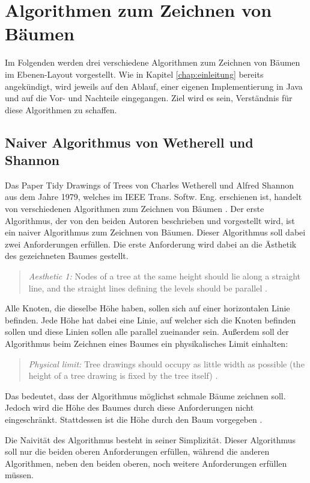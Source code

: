 \chapter{Algorithmen zum Zeichnen von Bäumen}
\label{chap:kapitel3}
Im Folgenden werden drei verschiedene Algorithmen zum Zeichnen von Bäumen im Ebenen-Layout vorgestellt. Wie in Kapitel \ref{chap:einleitung}
bereits angekündigt, wird jeweils auf den Ablauf, einer eigenen Implementierung in Java und auf die Vor- und Nachteile eingegangen. Ziel wird
es sein, Verständnis für diese Algorithmen zu schaffen.

\section{Naiver Algorithmus von Wetherell und Shannon}

Das Paper \glqq Tidy Drawings of Trees\grqq{} von Charles Wetherell und Alfred Shannon aus dem Jahre 1979, 
welches im IEEE Trans. Softw. Eng. erschienen ist, handelt von verschiedenen Algorithmen zum Zeichnen von Bäumen \cite[]{q1}.
Der erste Algorithmus, der von den beiden Autoren beschrieben und vorgestellt wird, ist ein naiver Algorithmus 
zum Zeichnen von Bäumen. Dieser Algorithmus soll dabei zwei Anforderungen erfüllen. Die erste Anforderung wird dabei
an die Ästhetik des gezeichneten Baumes gestellt. 
\begin{quotation}
	\textit{Aesthetic 1:} Nodes of a tree at the same height should lie
	along a straight line, and the straight lines defining the levels
	should be parallel \cite[S. 515]{q1}.
\end{quotation}
Alle Knoten, die dieselbe Höhe haben, sollen sich auf einer horizontalen
Linie befinden. Jede Höhe hat dabei eine Linie, auf welcher sich die Knoten befinden sollen und diese Linien sollen alle
parallel zueinander sein. Außerdem soll der Algorithmus beim Zeichnen eines Baumes ein physikalisches Limit einhalten:
\begin{quotation}
	\textit{Physical limit:} Tree drawings should occupy as little width
	as possible (the height of a tree drawing is fixed by the tree
	itself) \cite[S. 515]{q1}.
\end{quotation}
Das bedeutet, dass der Algorithmus möglichst schmale Bäume zeichnen soll. Jedoch wird die Höhe des Baumes durch diese Anforderungen
nicht eingeschränkt. Stattdessen ist die Höhe durch den Baum vorgegeben \cite[S. 515]{q1}.

Die Naivität des Algorithmus besteht in seiner Simplizität. Dieser Algorithmus soll nur die beiden oberen Anforderungen erfüllen,
während die anderen Algorithmen, neben den beiden oberen, noch weitere Anforderungen erfüllen müssen.  

